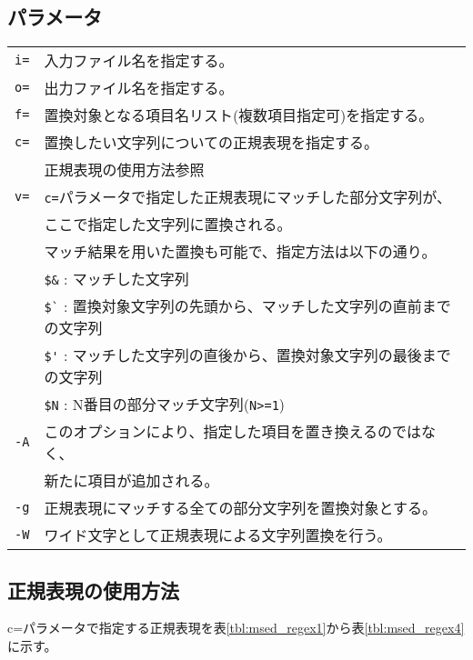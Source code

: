 \subsection*{パラメータ}
\begin{table}[htbp]
{\small
\begin{tabular}{ll}
\verb|i=|  & 入力ファイル名を指定する。\\
\verb|o=|  & 出力ファイル名を指定する。\\
\verb|f=|  & 置換対象となる項目名リスト(複数項目指定可)を指定する。\\
\verb|c=|  & 置換したい文字列についての正規表現を指定する。\\
           & 正規表現の使用方法参照\\
\verb|v=|  & \verb|c=|パラメータで指定した正規表現にマッチした部分文字列が、\\
           & ここで指定した文字列に置換される。\\
           & マッチ結果を用いた置換も可能で、指定方法は以下の通り。\\
           & \verb|$&| : マッチした文字列\\
           & \verb|$`| : 置換対象文字列の先頭から、マッチした文字列の直前までの文字列\\
           & \verb|$'| : マッチした文字列の直後から、置換対象文字列の最後までの文字列\\
           & \verb|$N| : N番目の部分マッチ文字列(\verb|N>=1|)\\
\verb|-A|  & このオプションにより、指定した項目を置き換えるのではなく、\\
           & 新たに項目が追加される。\\
\verb|-g|  & 正規表現にマッチする全ての部分文字列を置換対象とする。\\
\verb|-W|  & ワイド文字として正規表現による文字列置換を行う。\\
\end{tabular} 
}
\end{table} 


\subsection*{正規表現の使用方法}
c=パラメータで指定する正規表現を表\ref{tbl:msed_regex1}から表\ref{tbl:msed_regex4}に示す。

